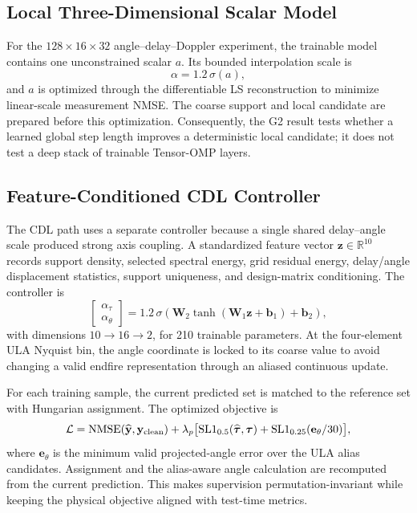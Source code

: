 \subsection{Local Three-Dimensional Scalar Model}

For the $128\times16\times32$ angle--delay--Doppler experiment, the trainable model contains one unconstrained scalar $a$. Its bounded interpolation scale is
\begin{equation}
  \alpha=1.2\,\sigma(a),
  \label{eq:scalar_alpha}
\end{equation}
and $a$ is optimized through the differentiable LS reconstruction to minimize linear-scale measurement NMSE. The coarse support and local candidate are prepared before this optimization. Consequently, the G2 result tests whether a learned global step length improves a deterministic local candidate; it does not test a deep stack of trainable Tensor-OMP layers.

\subsection{Feature-Conditioned CDL Controller}

The CDL path uses a separate controller because a single shared delay--angle scale produced strong axis coupling. A standardized feature vector $\mathbf{z}\in\mathbb{R}^{10}$ records support density, selected spectral energy, grid residual energy, delay/angle displacement statistics, support uniqueness, and design-matrix conditioning. The controller is
\begin{equation}
  \begin{bmatrix}\alpha_\tau\\ \alpha_\theta\end{bmatrix}
  =1.2\,\sigma\!\left(
    \mathbf{W}_2\tanh(\mathbf{W}_1\mathbf{z}+\mathbf{b}_1)+\mathbf{b}_2
  \right),
  \label{eq:feature_controller}
\end{equation}
with dimensions $10\!\rightarrow\!16\!\rightarrow\!2$, for 210 trainable parameters. At the four-element ULA Nyquist bin, the angle coordinate is locked to its coarse value to avoid changing a valid endfire representation through an aliased continuous update.

For each training sample, the current predicted set is matched to the reference set with Hungarian assignment. The optimized objective is
\begin{equation}
  \mathcal{L}
  =\operatorname{NMSE}(\widehat{\mathbf{y}},\mathbf{y}_{\rm clean})
  +\lambda_p\bigl[
      \operatorname{SL1}_{0.5}(\widehat{\boldsymbol{\tau}},\boldsymbol{\tau})
      +\operatorname{SL1}_{0.25}(\mathbf{e}_\theta/30)
    \bigr],
  \label{eq:training_loss}
\end{equation}
where $\mathbf{e}_\theta$ is the minimum valid projected-angle error over the ULA alias candidates. Assignment and the alias-aware angle calculation are recomputed from the current prediction. This makes supervision permutation-invariant while keeping the physical objective aligned with test-time metrics.

